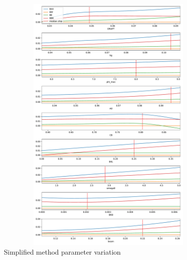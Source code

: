 \begin{figure}[H]
    \centering
    \includegraphics[height=13cm, width=15cm]{figures/ikeda_variation.pdf}
    \caption{Simplified method parameter variation}
    \label{fig:ikeda_variation}
\end{figure}

